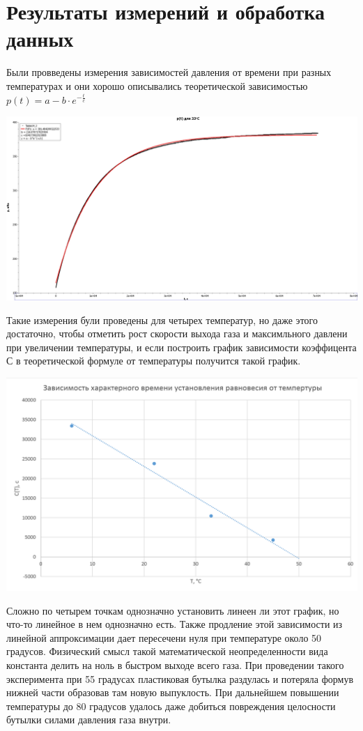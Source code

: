 \documentclass[12pt,a4paper]{scrartcl}
\begin{document}
\section{Результаты измерений и обработка данных}
Были провведены измерения зависимостей давления от времени при разных температурах и они хорошо описывались теоретической зависимостью $ p(t) = a - b\cdot e^{-\frac{t}{c}}$
\begin{flushleft}
\includegraphics[scale=0.4]{Demo}
\end{flushleft}
Такие измерения були проведены для четырех температур, но даже этого достаточно, чтобы отметить рост скорости выхода газа и максимльного давлени при увеличении температуры, и если построить график зависимости коэффицента С в теоретической формуле от температуры получится такой график.
\begin{flushleft}
\includegraphics[scale=0.6]{RandomPower}
\end{flushleft}
Сложно по четырем точкам однозначно установить линеен ли этот график, но что-то линейное в нем однозначно есть. Также продление этой зависимости из линейной аппроксимации дает пересечени нуля при температуре около 50 градусов. Физический смысл такой математической неопределенности вида константа делить на ноль в быстром выходе всего газа. При проведении такого эксперимента при 55 градусах пластиковая бутылка раздулась и потеряла формув нижней части образовав там новую выпуклость. При дальнейшем повышении температуры до 80 градусов удалось даже добиться повреждения целосности бутылки силами давления газа внутри.
\end{document}
